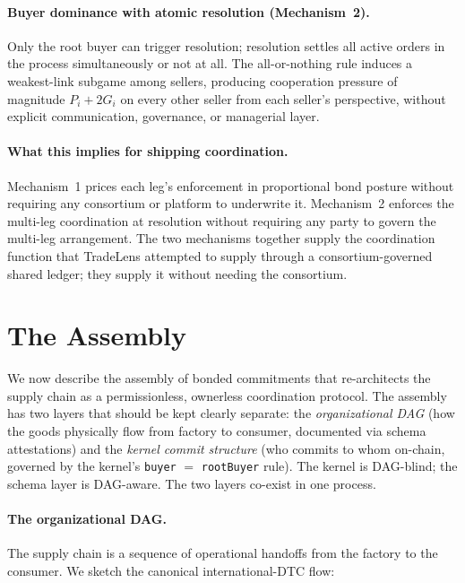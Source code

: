 \documentclass[11pt,a4paper]{article}
\theoremstyle{definition}
\theoremstyle{remark}
\newcommand{\pay}{P}
\newcommand{\cumval}{G}
\begin{document}
\paragraph{Buyer dominance with atomic resolution (Mechanism~2).}
Only the root buyer can trigger resolution; resolution settles all
active orders in the process simultaneously or not at all. The
all-or-nothing rule induces a weakest-link subgame among sellers,
producing cooperation pressure of magnitude $\pay_i + 2\cumval_i$
on every other seller from each seller's perspective, without
explicit communication, governance, or managerial layer.

\paragraph{What this implies for shipping coordination.}
Mechanism~1 prices each leg's enforcement in proportional bond
posture without requiring any consortium or platform to underwrite
it. Mechanism~2 enforces the multi-leg coordination at resolution
without requiring any party to govern the multi-leg arrangement.
The two mechanisms together supply the coordination function that
TradeLens attempted to supply through a consortium-governed shared
ledger; they supply it without needing the consortium.

\section{The Assembly}
\label{sec:assembly}

We now describe the assembly of bonded commitments that
re-architects the supply chain as a permissionless, ownerless
coordination protocol. The assembly has two layers that should be
kept clearly separate: the \emph{organizational DAG} (how the
goods physically flow from factory to consumer, documented via
schema attestations) and the \emph{kernel commit structure} (who
commits to whom on-chain, governed by the kernel's
\texttt{buyer} $=$ \texttt{rootBuyer} rule). The kernel is
DAG-blind; the schema layer is DAG-aware. The two layers co-exist
in one process.

\paragraph{The organizational DAG.}
The supply chain is a sequence of operational handoffs from the
factory to the consumer. We sketch the canonical
international-DTC flow:
\end{document}
